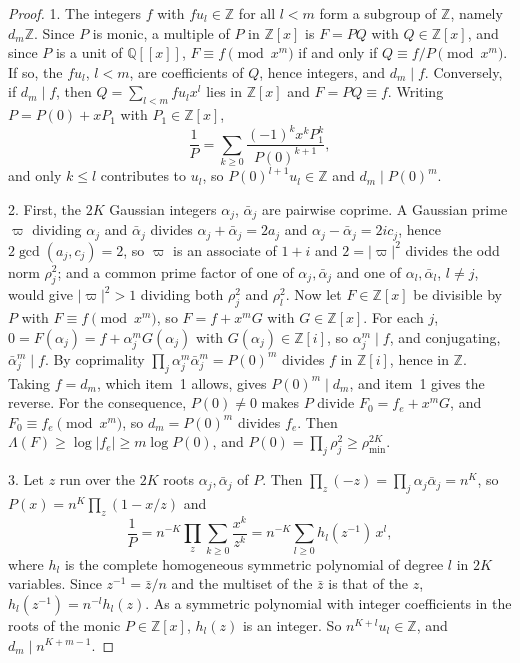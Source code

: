 \documentclass[11pt]{article}
\begin{document}
\begin{proof}
1.  The integers $f$ with $fu_l\in\mathbb Z$ for all $l<m$ form a subgroup of
$\mathbb Z$, namely $d_m\mathbb Z$.  Since $P$ is monic, a multiple of $P$ in
$\mathbb Z[x]$ is $F=PQ$ with $Q\in\mathbb Z[x]$, and since $P$ is a unit of
$\mathbb Q[[x]]$, $F\equiv f\pmod{x^m}$ if and only if $Q\equiv f/P\pmod{x^m}$.
If so, the $fu_l$, $l<m$, are coefficients of $Q$, hence integers, and
$d_m\mid f$.  Conversely, if $d_m\mid f$, then $Q=\sum_{l<m}fu_lx^l$ lies in
$\mathbb Z[x]$ and $F=PQ\equiv f$.  Writing $P=P(0)+xP_1$ with
$P_1\in\mathbb Z[x]$,
\[
  \frac1P=\sum_{k\ge0}\frac{(-1)^kx^kP_1^k}{P(0)^{k+1}},
\]
and only $k\le l$ contributes to $u_l$, so $P(0)^{l+1}u_l\in\mathbb Z$ and
$d_m\mid P(0)^m$.

2.  First, the $2K$ Gaussian integers $\alpha_j$, $\bar\alpha_j$ are pairwise
coprime.  A Gaussian prime $\varpi$ dividing $\alpha_j$ and $\bar\alpha_j$ divides
$\alpha_j+\bar\alpha_j=2a_j$ and $\alpha_j-\bar\alpha_j=2ic_j$, hence
$2\gcd(a_j,c_j)=2$, so $\varpi$ is an associate of $1+i$ and $2=|\varpi|^2$ divides
the odd norm $\rho_j^2$; and a common prime factor of one of $\alpha_j,\bar\alpha_j$
and one of $\alpha_l,\bar\alpha_l$, $l\ne j$, would give $|\varpi|^2>1$ dividing
both $\rho_j^2$ and $\rho_l^2$.  Now let $F\in\mathbb Z[x]$ be divisible by $P$
with $F\equiv f\pmod{x^m}$, so $F=f+x^mG$ with $G\in\mathbb Z[x]$.  For each $j$,
$0=F(\alpha_j)=f+\alpha_j^mG(\alpha_j)$ with $G(\alpha_j)\in\mathbb Z[i]$, so
$\alpha_j^m\mid f$, and conjugating, $\bar\alpha_j^m\mid f$.  By coprimality
$\prod_j\alpha_j^m\bar\alpha_j^m=P(0)^m$ divides $f$ in $\mathbb Z[i]$, hence in
$\mathbb Z$.  Taking $f=d_m$, which item~1 allows, gives $P(0)^m\mid d_m$, and
item~1 gives the reverse.  For the consequence, $P(0)\ne0$ makes $P$ divide
$F_0=f_e+x^mG$, and $F_0\equiv f_e\pmod{x^m}$, so $d_m=P(0)^m$ divides $f_e$.
Then $\Lambda(F)\ge\log|f_e|\ge m\log P(0)$, and
$P(0)=\prod_j\rho_j^2\ge\rho_{\min}^{2K}$.

3.  Let $z$ run over the $2K$ roots $\alpha_j,\bar\alpha_j$ of $P$.  Then
$\prod_z(-z)=\prod_j\alpha_j\bar\alpha_j=n^K$, so
$P(x)=n^K\prod_z(1-x/z)$ and
\[
  \frac1P=n^{-K}\prod_z\sum_{k\ge0}\frac{x^k}{z^k}
  =n^{-K}\sum_{l\ge0}h_l(z^{-1})\,x^l,
\]
where $h_l$ is the complete homogeneous symmetric polynomial of degree $l$ in
$2K$ variables.  Since $z^{-1}=\bar z/n$ and the multiset of the $\bar z$ is
that of the $z$, $h_l(z^{-1})=n^{-l}h_l(z)$.  As a symmetric polynomial with
integer coefficients in the roots of the monic $P\in\mathbb Z[x]$, $h_l(z)$ is
an integer.  So $n^{K+l}u_l\in\mathbb Z$, and $d_m\mid n^{K+m-1}$.
\end{proof}
\end{document}
